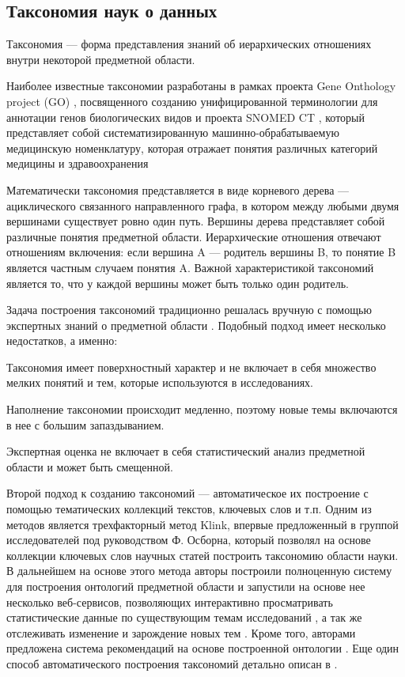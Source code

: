 \documentclass[12pt]{article}
\newenvironment{itemize*}%
{\begin{itemize}%
		\setlength{\itemsep}{0pt}%
		\setlength{\parskip}{0pt}}%
	{\end{itemize}}
\begin{document}
\subsection{Таксономия наук о данных}

Таксономия --- форма представления знаний об иерархических отношениях внутри некоторой предметной области.

Наиболее известные таксономии разработаны в рамках проекта Gene Onthology project (GO) \cite{gene2018gene}, посвященного созданию унифицированной терминологии для аннотации генов биологических видов и проекта SNOMED CT \cite{lee2013survey}, который представляет собой систематизированную машинно-обрабатываемую медицинскую номенклатуру, которая отражает понятия различных категорий медицины и здравоохранения

Математически таксономия представляется в виде корневого дерева --- ациклического связанного направленного графа, в котором между любыми двумя вершинами существует ровно один путь. Вершины дерева представляет собой различные понятия предметной области. Иерархические отношения отвечают отношениям включения: если вершина A --- родитель вершины B, то понятие B является частным случаем понятия A. Важной характеристикой таксономий является то, что у каждой вершины может быть только один родитель. 

Задача построения таксономий традиционно решалась вручную с помощью экспертных знаний о предметной области \cite{usman2017taxonomies}. Подобный подход имеет несколько недостатков, а именно:
\begin{itemize*}
	\item Таксономия имеет поверхностный характер и не включает в себя множество мелких понятий и тем, которые используются в исследованиях.
	\item Наполнение таксономии происходит медленно, поэтому новые темы включаются в нее с большим запаздыванием.
	\item Экспертная оценка не включает в себя статистический анализ предметной области и может быть смещенной.
\end{itemize*}

Второй подход к созданию таксономий --- автоматическое их построение с помощью тематических коллекций текстов, ключевых слов и т.п. Одним из методов является трехфакторный метод Klink, впервые предложенный в \cite{Osborne2012} группой исследователей под руководством Ф. Осборна, который позволял на основе коллекции ключевых слов научных статей построить таксономию области науки. В дальнейшем на основе этого метода авторы построили полноценную систему для построения онтологий предметной области \cite{Osborne2015} и запустили на основе нее несколько веб-сервисов, позволяющих интерактивно просматривать статистические данные по существующим темам исследований \cite{Salatino2018}, а так же отслеживать изменение и зарождение новых тем \cite{Osborne2013}. Кроме того, авторами предложена система рекомендаций на основе построенной онтологии \cite{Thanapalasingam2018}. Еще один способ автоматического построения таксономий детально описан в \cite{usman2017taxonomies}.
\end{document}
